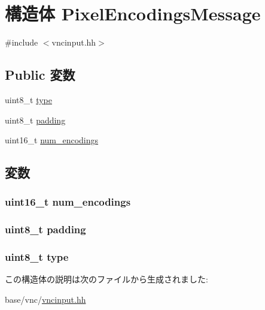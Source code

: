 \hypertarget{structVncInput_1_1PixelEncodingsMessage}{
\section{構造体 PixelEncodingsMessage}
\label{structVncInput_1_1PixelEncodingsMessage}
}


{\ttfamily \#include $<$vncinput.hh$>$}\subsection*{Public 変数}
\begin{DoxyCompactItemize}
\item 
uint8\_\-t \hyperlink{structVncInput_1_1PixelEncodingsMessage_a1d127017fb298b889f4ba24752d08b8e}{type}
\item 
uint8\_\-t \hyperlink{structVncInput_1_1PixelEncodingsMessage_a78a52d3de83ec4d91a7746456627089f}{padding}
\item 
uint16\_\-t \hyperlink{structVncInput_1_1PixelEncodingsMessage_a52e91b058e818ea1aee27b39bd497969}{num\_\-encodings}
\end{DoxyCompactItemize}


\subsection{変数}
\hypertarget{structVncInput_1_1PixelEncodingsMessage_a52e91b058e818ea1aee27b39bd497969}{
\subsubsection[{num\_\-encodings}]{\setlength{\rightskip}{0pt plus 5cm}uint16\_\-t {\bf num\_\-encodings}}}
\label{structVncInput_1_1PixelEncodingsMessage_a52e91b058e818ea1aee27b39bd497969}
\hypertarget{structVncInput_1_1PixelEncodingsMessage_a78a52d3de83ec4d91a7746456627089f}{
\subsubsection[{padding}]{\setlength{\rightskip}{0pt plus 5cm}uint8\_\-t {\bf padding}}}
\label{structVncInput_1_1PixelEncodingsMessage_a78a52d3de83ec4d91a7746456627089f}
\hypertarget{structVncInput_1_1PixelEncodingsMessage_a1d127017fb298b889f4ba24752d08b8e}{
\subsubsection[{type}]{\setlength{\rightskip}{0pt plus 5cm}uint8\_\-t {\bf type}}}
\label{structVncInput_1_1PixelEncodingsMessage_a1d127017fb298b889f4ba24752d08b8e}


この構造体の説明は次のファイルから生成されました:\begin{DoxyCompactItemize}
\item 
base/vnc/\hyperlink{vncinput_8hh}{vncinput.hh}\end{DoxyCompactItemize}
